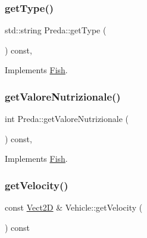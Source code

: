 \subsubsection{\texorpdfstring{get\+Type()}{getType()}}
{\footnotesize\ttfamily std\+::string Preda\+::get\+Type (\begin{DoxyParamCaption}{ }\end{DoxyParamCaption}) const\hspace{0.3cm}{\ttfamily [override]}, {\ttfamily [virtual]}}



Implements \hyperlink{classFish_adb00fb6bac2fad27660107c12d1a7fa2_adb00fb6bac2fad27660107c12d1a7fa2}{Fish}.

\mbox{\label{classPreda_a9f0e2e1f347466a5084f887dab6c218f_a9f0e2e1f347466a5084f887dab6c218f}} 
\subsubsection{\texorpdfstring{get\+Valore\+Nutrizionale()}{getValoreNutrizionale()}}
{\footnotesize\ttfamily int Preda\+::get\+Valore\+Nutrizionale (\begin{DoxyParamCaption}{ }\end{DoxyParamCaption}) const\hspace{0.3cm}{\ttfamily [override]}, {\ttfamily [virtual]}}



Implements \hyperlink{classFish_a97dd71f31af1e36a630944c5c5b8ff33_a97dd71f31af1e36a630944c5c5b8ff33}{Fish}.

\mbox{\label{classVehicle_a87b8266cb3495e8444233a0724e1bf07_a87b8266cb3495e8444233a0724e1bf07}} 
\subsubsection{\texorpdfstring{get\+Velocity()}{getVelocity()}}
{\footnotesize\ttfamily const \hyperlink{classVect2D}{Vect2D} \& Vehicle\+::get\+Velocity (\begin{DoxyParamCaption}{ }\end{DoxyParamCaption}) const\hspace{0.3cm}{\ttfamily [inherited]}}

